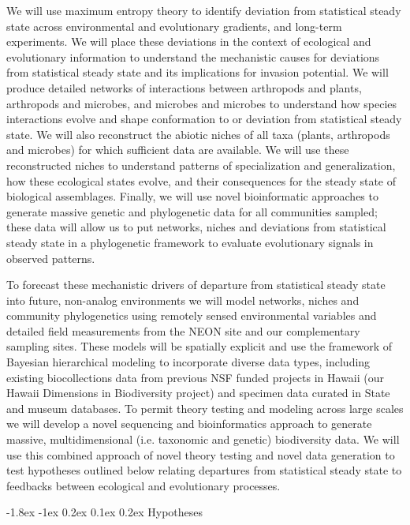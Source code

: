 \documentclass[11pt]{article}
\makeatletter
\renewcommand\subsubsection{\@startsection{subsection}{1}{\z@}%
                                  {-1.8ex \@plus -1ex \@minus 0.2ex}%
                                  {0.1ex \@plus 0.2ex}%
                                  {\normalfont\bfseries}}
\makeatother
\begin{document}
We will use maximum entropy theory to identify deviation from
statistical steady state across environmental and evolutionary
gradients, and long-term experiments.  We will place these deviations
in the context of ecological and evolutionary information to
understand the mechanistic causes for deviations from statistical
steady state and its implications for invasion potential.  We will
produce detailed networks of interactions between arthropods and
plants, arthropods and microbes, and microbes and microbes to
understand how species interactions evolve and shape conformation to
or deviation from statistical steady state.  We will also reconstruct
the abiotic niches of all taxa (plants, arthropods and microbes) for
which sufficient data are available.  We will use these reconstructed
niches to understand patterns of specialization and generalization,
how these ecological states evolve, and their consequences for the
steady state of biological assemblages.  Finally, we will use novel
bioinformatic approaches to generate massive genetic and phylogenetic
data for all communities sampled; these data will allow us to put
networks, niches and deviations from statistical steady state in a
phylogenetic framework to evaluate evolutionary signals in observed
patterns.

To forecast these mechanistic drivers of departure from statistical
steady state into future, non-analog environments we will model
networks, niches and community phylogenetics using remotely sensed
environmental variables and detailed field measurements from the NEON
site and our complementary sampling sites.  These models will be
spatially explicit and use the framework of Bayesian hierarchical
modeling to incorporate diverse data types, including existing
biocollections data from previous NSF funded projects in Hawaii (our
Hawaii Dimensions in Biodiversity project) and specimen data curated
in State and museum databases.  To permit theory testing and modeling
across large scales we will develop a novel sequencing and
bioinformatics approach to generate massive, multidimensional
(i.e. taxonomic and genetic) biodiversity data.  We will use this
combined approach of novel theory testing and novel data generation to
test hypotheses outlined below relating departures from statistical
steady state to feedbacks between ecological and evolutionary
processes.

\subsubsection{Hypotheses}
\end{document}
